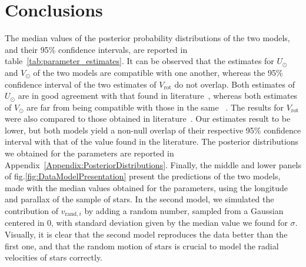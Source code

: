 \section{Conclusions}

The median values of the posterior probability distributions of the two models, and their 95\% confidence intervals, are reported in table~\ref{tab:parameter_estimates}. It can be observed that the estimates for $U_\odot$ and $V_\odot$ of the two models are compatible with one another, whereas the 95\% confidence interval of the two estimates of $V_{\text{rot}}$ do not overlap. Both estimates of $U_\odot$ are in good agreement with that found in literature~\cite{LocalKinematics}, whereas both estimates of $V_\odot$ are far from being compatible with those in the same ~\cite{LocalKinematics}. The results for $V_{\text{rot}}$ were also compared to those obtained in literature~\cite{GalacticKinematics}. Our estimates result to be lower, but both models yield a non-null overlap of their respective 95\% confidence interval with that of the value found in the literature. The posterior distributions we obtained for the parameters are reported in Appendix~\ref{Appendix:PosteriorDistributions}.
Finally, the middle and lower panels of fig.\ref{fig:DataModelPresentation} present the predictions of the two models, made with the median values obtained for the parameters, using the longitude and parallax of the sample of stars. In the second model, we simulated the contribution of $v_{\text{rand}, i}$ by adding a random number, sampled from a Gaussian centered in 0, with standard deviation given by the median value we found for $\sigma$. Visually, it is clear that the second model reproduces the data better than the first one, and that the random motion of stars is crucial to model the radial velocities of stars correctly. 

